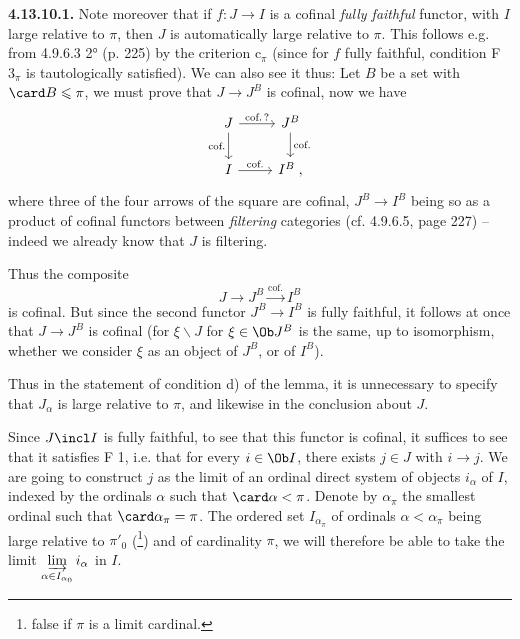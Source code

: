 \textbf{4.13.10.1.} Note moreover that if $f : J\longrightarrow I$ is a cofinal \textit{fully faithful} functor, with $I$ large relative to $\pi$, then $J$ is automatically large relative to $\pi$. This follows e.g. from 4.9.6.3 2° (p. 225) by the criterion $\mathrm{c}_\pi$ (since for $f$ fully faithful, condition F $3_\pi$ is tautologically satisfied). We can also see it thus: Let $B$ be a set with $\card B\leqslant\pi$, we must prove that $J\longrightarrow J^B$ is cofinal, now we have
\[
\begin{tikzcd}
J \arrow[r, "\text{cof.\,?}"] \arrow[d, "\text{cof.}"'] & J^B \arrow[d, "\text{cof.}"] \\
I \arrow[r, "\text{cof.}"] & I^B \; ,
\end{tikzcd}
\]
where three of the four arrows of the square are cofinal, $J^B\longrightarrow I^B$ being so as a product of cofinal functors between \textit{filtering} categories (cf. 4.9.6.5, page 227) -- indeed we already know that $J$ is filtering.

Thus the composite
\[ J \longrightarrow J^B \xrightarrow{\text{cof.}} I^B \]
is cofinal. But since the second functor $J^B\longrightarrow I^B$ is fully faithful, it follows at once that $J\longrightarrow J^B$ is cofinal (for $\xi\backslash J$ for $\xi\in\Ob J^B$ is the same, up to isomorphism, whether we consider $\xi$ as an object of $J^B$, or of $I^B$).

Thus in the statement of condition d) of the lemma, it is unnecessary to specify that $J_\alpha$ is large relative to $\pi$, and likewise in the conclusion about $J$.

Since $J\incl I$ is fully faithful, to see that this functor is cofinal, it suffices to see that it satisfies F 1, i.e. that for every $i\in\Ob I$, there exists $j\in J$ with $i\longrightarrow j$. We are going to construct $j$ as the limit of an ordinal direct system of objects $i_\alpha$ of $I$, indexed by the ordinals $\alpha$ such that $\card\alpha<\pi$. Denote by $\alpha_\pi$ the smallest ordinal such that %
$\card\alpha_\pi=\pi$. The ordered set $I_{\alpha_\pi}$ of ordinals $\alpha<\alpha_\pi$ being large relative to $\pi'_0$ (\footnote[129]{false if $\pi$ is a limit cardinal.}) and of cardinality $\pi$, we will therefore be able to take the limit $\varinjlim\limits_{\alpha\in I_{\alpha_0}} i_\alpha$ in $I$. %

